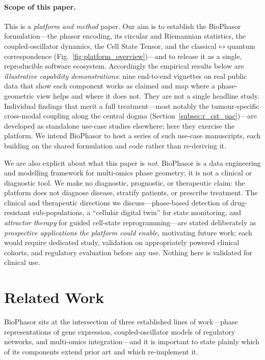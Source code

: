 \documentclass[preprint,12pt,amsmath,amssymb,superscriptaddress,floatfix]{revtex4-2}
\begin{document}
\paragraph{Scope of this paper.}
This is a \emph{platform and method} paper. Our aim is to establish the BioPhasor
formulation---the phasor encoding, its circular and Riemannian statistics, the
coupled-oscillator dynamics, the Cell State Tensor, and the
classical$\leftrightarrow$quantum correspondence (Fig.~\ref{fig:platform_overview})---and
to release it as a single, reproducible software ecosystem. Accordingly the empirical results below are
\emph{illustrative capability demonstrations}: nine end-to-end vignettes on real
public data that show each component works as claimed and map where a
phase-geometric view helps and where it does not. They are not a single headline
study. Individual findings that merit a full treatment---most notably the
tumour-specific cross-modal coupling along the central dogma
(Section~\ref{subsec:r_cst_pac})---are developed as standalone use-case studies
elsewhere; here they exercise the platform. We intend BioPhasor to host a series
of such use-case manuscripts, each building on the shared formulation and code
rather than re-deriving it.

We are also explicit about what this paper is \emph{not}. BioPhasor is a data
engineering and modelling framework for multi-omics phase geometry; it is not a
clinical or diagnostic tool. We make no diagnostic, prognostic, or therapeutic
claim: the platform does not diagnose disease, stratify patients, or prescribe
treatment. The clinical and therapeutic directions we discuss---phase-based
detection of drug-resistant sub-populations, a ``cellular digital twin'' for
state monitoring, and \emph{attractor therapy} for guided cell-state
reprogramming---are stated deliberately as \emph{prospective applications the
platform could enable}, motivating future work; each would require dedicated
study, validation on appropriately powered clinical cohorts, and regulatory
evaluation before any use. Nothing here is validated for clinical use.

\section{Related Work}
\label{sec:related_work}

BioPhasor sits at the intersection of three established lines of work---phase
representations of gene expression, coupled-oscillator models of regulatory
networks, and multi-omics integration---and it is important to state plainly
which of its components extend prior art and which re-implement it.
\end{document}
